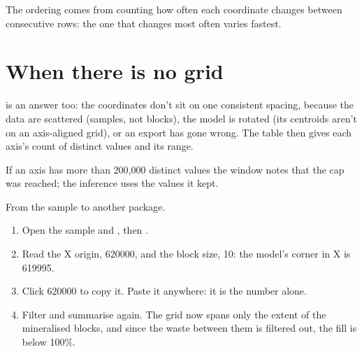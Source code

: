The ordering comes from counting how often each coordinate changes between consecutive rows: the one
that changes most often varies fastest.

\section{When there is no grid}

 is an answer too: the coordinates don't sit on one consistent spacing,
because the data are scattered (samples, not blocks), the model is rotated (its centroids aren't on
an axis-aligned grid), or an export has gone wrong. The table then gives each axis's count of distinct
values and its range.

If an axis has more than 200{,}000 distinct values the window notes that the cap was reached; the
inference uses the values it kept.

\begin{tryit}
From the sample to another package.
\begin{enumerate}
\item Open the sample and , then .
\item Read the X origin, 620000, and the block size, 10: the model's corner in X is 619995.
\item Click 620000 to copy it. Paste it anywhere: it is the number alone.
\item Filter  and summarise again. The grid now spans only the extent of the
mineralised blocks, and since the waste between them is filtered out, the fill is below 100\%.
\end{enumerate}
\end{tryit}
